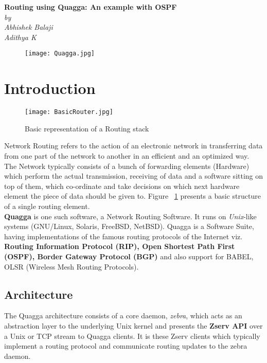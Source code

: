\documentclass{article}
\begin{document}
\begin{titlepage}
\begin{center}
    \Large\textbf{Routing using Quagga: An example with OSPF}\\
    \textit{by}\\
    \large\textit{Abhishek Balaji \\ Adithya K}
\end{center}
\vspace{2cm}
\begin{figure}[ht!]
  \centering
  \texttt{[image: Quagga.jpg]}
\end{figure}

\end{titlepage}
\tableofcontents
\clearpage
\section{Introduction}
\begin{figure}[ht!]
  \centering
  \texttt{[image: BasicRouter.jpg]}
  \caption{Basic representation of a Routing stack}
  \label{fig:basicrouter}
\end{figure}
Network Routing refers to the action of an electronic network in transferring data 
from one part of the network to another in an efficient and an optimized way. 
The Network typically consists of a bunch of forwarding elements (Hardware) which 
perform the actual transmission, receiving of data and a software sitting on top of them, 
which co-ordinate and take decisions on which next hardware element the piece of data 
should be given to. Figure~ \ref{fig:basicrouter} presents a basic structure 
of a single routing element.\\
\textbf{Quagga} is one such software, a Network Routing Software. It runs on \textit{Unix}-like systems 
(GNU/Linux, Solaris, FreeBSD, NetBSD). Quagga is a Software Suite, having implementations 
of the famous routing protocols of the Internet viz. \textbf{Routing Information Protocol (RIP), 
Open Shortest Path First (OSPF), Border Gateway Protocol (BGP)} and also support for 
BABEL, OLSR (Wireless Mesh Routing Protocols).\\

\subsection{Architecture}
The Quagga architecture consists of a core daemon, \textit{zebra}, which acts as an abstraction 
layer to the underlying Unix kernel and presents the \textbf{Zserv API} over a Unix or TCP stream 
to Quagga clients. It is these Zserv clients which typically implement a routing protocol 
and communicate routing updates to the zebra daemon.\cite{quaggaofficial}
\end{document}
